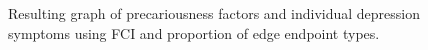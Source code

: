 \documentclass[
]{article}
\begin{document}
\begin{figure}

\begin{minipage}{\linewidth}



\end{minipage}%
\newline
\begin{minipage}{\linewidth}



\end{minipage}%

\caption{\label{fig-sym}Resulting graph of precariousness factors and
individual depression symptoms using FCI and proportion of edge endpoint
types.}

\end{figure}%
\end{document}
